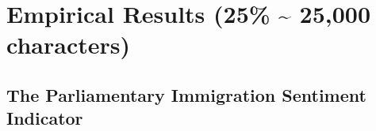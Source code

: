 \documentclass[12pt]{scrartcl}
\numberwithin{equation}{section}				%
\begin{document}
    
    \clearpage
    \section{Empirical Results (25\% \; \textasciitilde{} 25,000 characters)}
    
    \subsection{The Parliamentary Immigration Sentiment Indicator}
    
\end{document}
